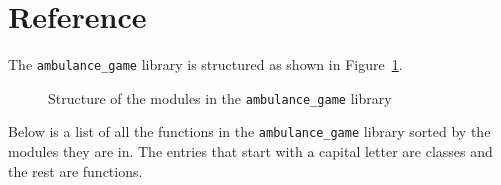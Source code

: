 \section{Reference}\label{sec:ambulance_game_reference}

The \texttt{ambulance\_game} library is structured as shown in
Figure~\ref{fig:ambulance_game_structure}.

\begin{figure}[H]
    \caption{Structure of the modules in the \texttt{ambulance\_game} library}
    \label{fig:ambulance_game_structure}
\end{figure}


Below is a list of all the functions in the \texttt{ambulance\_game} library
sorted by the modules they are in.
The entries that start with a capital letter are classes and the rest are
functions.

